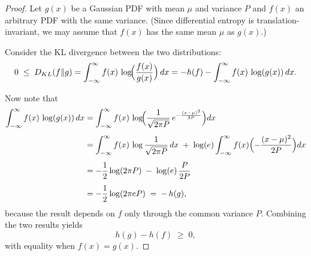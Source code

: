 \begin{proof}
Let \(g(x)\) be a Gaussian PDF with mean \(\mu\) and variance \(P\) and
\(f(x)\) an arbitrary PDF with the same variance.  
(Since differential entropy is translation-invariant, we may assume that
\(f(x)\) has the same mean \(\mu\) as \(g(x)\).)

\medskip
\noindent
Consider the KL divergence between the two distributions:
\[
0 \;\le\; D_{KL}(f\|g)
      = \int_{-\infty}^{\infty} f(x)\,
        \log\!\Bigl(\frac{f(x)}{g(x)}\Bigr)\,dx
      = -h(f)-\int_{-\infty}^{\infty} f(x)\,\log(g(x))\,dx.
\]

\medskip
\noindent
Now note that
\begin{align*}
\int_{-\infty}^{\infty} f(x)\,\log(g(x))\,dx
&=\int_{-\infty}^{\infty}
  f(x)\,\log\!\Bigl(
    \frac{1}{\sqrt{2\pi P}}\,
    e^{-\frac{(x-\mu)^2}{2P}}
  \Bigr)dx \\[4pt]
&=\int_{-\infty}^{\infty}
  f(x)\,\log\frac{1}{\sqrt{2\pi P}}\,dx
  \;+\;\log(e)\int_{-\infty}^{\infty}
  f(x)\Bigl(-\frac{(x-\mu)^2}{2P}\Bigr)dx \\[4pt]
&=-\frac12\log(2\pi P)\;-\;\log(e)\,
      \frac{P}{2P} \\[4pt]
&=-\frac12\log(2\pi e P) \;=\; -\,h(g),
\end{align*}
because the result depends on \(f\) only through the common variance \(P\).
\medskip
\noindent
Combining the two results yields
\[
h(g)-h(f)\;\ge\;0,
\]
with equality when \(f(x)=g(x)\).
\end{proof}